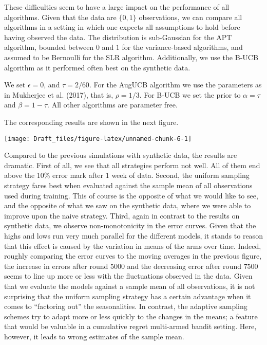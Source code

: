 \documentclass[12pt,]{article}
\begin{document}
These difficulties seem to have a large impact on the performance of all
algorithms. Given that the data are \(\{0,1\}\) observations, we can
compare all algorithms in a setting in which one expects all assumptions
to hold before having observed the data. The distribution is
sub-Gaussian for the APT algorithm, bounded between \(0\) and \(1\) for
the variance-based algorithms, and assumed to be Bernoulli for the SLR
algorithm. Additionally, we use the B-UCB algorithm as it performed
often best on the synthetic data.

We set \(\epsilon = 0\), and \(\tau = 2/60\). For the AugUCB algorithm
we use the parameters as in Mukherjee et al. (2017), that is,
\(\rho = 1/3\). For B-UCB we set the prior to \(\alpha = \tau\) and
\(\beta = 1-\tau\). All other algorithms are parameter free.

The corresponding results are shown in the next figure.

\begin{center}\texttt{[image: Draft\_files/figure-latex/unnamed-chunk-6-1]} \end{center}

Compared to the previous simulations with synthetic data, the results
are dramatic. First of all, we see that all strategies perform not well.
All of them end above the 10\% error mark after 1 week of data. Second,
the uniform sampling strategy fares best when evaluated against the
sample mean of all observations used during training. This of course is
the opposite of what we would like to see, and the opposite of what we
saw on the synthetic data, where we were able to improve upon the naive
strategy. Third, again in contrast to the results on synthetic data, we
observe non-monotonicity in the error curves. Given that the highs and
lows run very much parallel for the different models, it stands to
reason that this effect is caused by the variation in means of the arms
over time. Indeed, roughly comparing the error curves to the moving
averages in the previous figure, the increase in errors after round
\(5000\) and the decreasing error after round \(7500\) seems to line up
more or less with the fluctuations observed in the data. Given that we
evaluate the models against a sample mean of all observations, it is not
surprising that the uniform sampling strategy has a certain advantage
when it comes to ``factoring out'' the seasonalities. In contrast, the
adaptive sampling schemes try to adapt more or less quickly to the
changes in the means; a feature that would be valuable in a cumulative
regret multi-armed bandit setting. Here, however, it leads to wrong
estimates of the sample mean.
\end{document}
